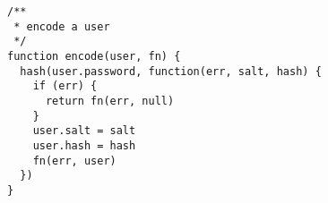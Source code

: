 
\lstset{language=C}

\begin{lstlisting}[frame=single]
/**
 * encode a user
 */
function encode(user, fn) {
  hash(user.password, function(err, salt, hash) {
    if (err) {
      return fn(err, null)
    }
    user.salt = salt
    user.hash = hash
    fn(err, user)
  })
}
\end{lstlisting}